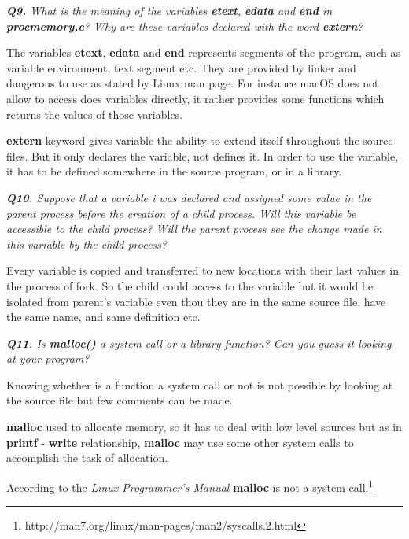 \documentclass[11pt]{article}
\begin{document}
\vspace{5mm}
\textit{\textbf{Q9.} What is the meaning of the variables \textbf{etext}, \textbf{edata} and \textbf{end} in \textbf{procmemory.c}? Why are these variables declared with the word \textbf{extern}?}
\vspace{5mm}

The variables \textbf{etext}, \textbf{edata} and \textbf{end} represents segments of the program, such as variable environment, text segment etc. They are provided by linker and dangerous to use as stated by Linux man page. For instance macOS does not allow to access does variables directly, it rather provides some functions which returns the values of those variables.

\textbf{extern} keyword gives variable the ability to extend itself throughout the source files. But it only declares the variable, not defines it. In order to use the variable, it has to be defined somewhere in the source program, or in a library.

\vspace{5mm}
\textit{\textbf{Q10.} Suppose that a variable i was declared and assigned some value in the parent process before the creation of a child process. Will this variable be accessible to the child process? Will the parent process see the change made in this variable by the child process?}
\vspace{5mm}

Every variable is copied and transferred to new locations with their last values in the process of fork. So the child could access to the variable but it would be isolated from parent's variable even thou they are in the same source file, have the same name, and same definition etc.

\vspace{5mm}
\textit{\textbf{Q11.} Is \textbf{malloc()} a system call or a library function? Can you guess it looking at your program?}
\vspace{5mm}

Knowing whether is a function a system call or not is not possible by looking at the source file but few comments can be made.

\textbf{malloc} used to allocate memory, so it has to deal with low level sources but as in \textbf{printf} - \textbf{write} relationship, \textbf{malloc} may use some other system calls to accomplish the task of allocation.

According to the \textit{Linux Programmer's Manual} \textbf{malloc} is not a system call.\footnote{http://man7.org/linux/man-pages/man2/syscalls.2.html}
\end{document}
